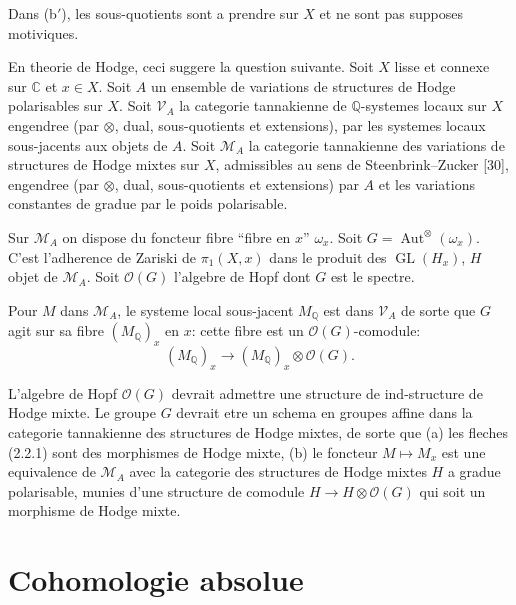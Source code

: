\documentclass[11pt,a4paper]{article}
\theoremstyle{plain}
\theoremstyle{definition}
\DeclareMathOperator{\Aut}{Aut}
\DeclareMathOperator{\GL}{GL}
\newcommand{\Q}{\mathbb{Q}}
\newcommand{\C}{\mathbb{C}}
\begin{document}
Dans (b$'$), les sous-quotients sont a prendre sur $X$ et ne sont pas supposes motiviques.

En theorie de Hodge, ceci suggere la question suivante. Soit $X$ lisse et connexe sur $\C$ et $x \in X$. Soit $A$ un ensemble de variations de structures de Hodge polarisables sur $X$. Soit $\mathscr{V}_A$ la categorie tannakienne de $\Q$-systemes locaux sur $X$ engendree (par $\otimes$, dual, sous-quotients et extensions), par les systemes locaux sous-jacents aux objets de $A$. Soit $\mathcal{M}_A$ la categorie tannakienne des variations de structures de Hodge mixtes sur $X$, admissibles au sens de Steenbrink--Zucker [30], engendree (par $\otimes$, dual, sous-quotients et extensions) par $A$ et les variations constantes de gradue par le poids polarisable.

Sur $\mathcal{M}_A$ on dispose du foncteur fibre ``fibre en $x$'' $\omega_x$. Soit $G = \Aut^{\otimes}(\omega_x)$. C'est l'adherence de Zariski de $\pi_1(X, x)$ dans le produit des $\GL(H_x)$, $H$ objet de $\mathcal{M}_A$. Soit $\mathcal{O}(G)$ l'algebre de Hopf dont $G$ est le spectre.

Pour $M$ dans $\mathcal{M}_A$, le systeme local sous-jacent $M_{\Q}$ est dans $\mathscr{V}_A$ de sorte que $G$ agit sur sa fibre $(M_{\Q})_x$ en $x$: cette fibre est un $\mathcal{O}(G)$-comodule:
\begin{equation}
\tag{2.2.1}
(M_{\Q})_x \to (M_{\Q})_x \otimes \mathcal{O}(G).
\end{equation}

L'algebre de Hopf $\mathcal{O}(G)$ devrait admettre une structure de ind-structure de Hodge mixte. Le groupe $G$ devrait etre un schema en groupes affine dans la categorie tannakienne des structures de Hodge mixtes, de sorte que (a) les fleches (2.2.1) sont des morphismes de Hodge mixte, (b) le foncteur $M \mapsto M_x$ est une equivalence de $\mathcal{M}_A$ avec la categorie des structures de Hodge mixtes $H$ a gradue polarisable, munies d'une structure de comodule $H \to H \otimes \mathcal{O}(G)$ qui soit un morphisme de Hodge mixte.


\section{Cohomologie absolue}

\subsection{}
\end{document}
